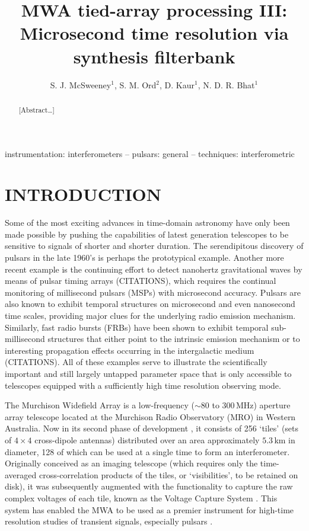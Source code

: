 \documentclass{pasa}%
\title[MWA tied-array processing III]{MWA tied-array processing III: Microsecond time resolution via synthesis filterbank}
\author[McSweeney et al.]{S. J. McSweeney$^1$, S. M. Ord$^2$, D. Kaur$^1$, N. D. R. Bhat$^1$
\affil{$^1$International Centre for Radio Astronomy Research (ICRAR), GPO Box U1987, Perth, WA 6845, Australia}%
\affil{$^2$CSIRO Astronomy and Space Science, PO Box 76, Epping, NSW 1710, Australia}
}
\begin{document}
\begin{frontmatter}
\maketitle

\begin{abstract}
[Abstract\dots]
\end{abstract}

\begin{keywords}
    instrumentation: interferometers -- pulsars: general -- techniques: interferometric
\end{keywords}
\end{frontmatter}


\section{INTRODUCTION}
\label{sec:intro}

Some of the most exciting advances in time-domain astronomy have only been made possible by pushing the capabilities of latest generation telescopes to be sensitive to signals of shorter and shorter duration.
The serendipitous discovery of pulsars in the late 1960's is perhaps the prototypical example.
Another more recent example is the continuing effort to detect nanohertz gravitational waves by means of pulsar timing arrays (CITATIONS), which requires the continual monitoring of millisecond pulsars (MSPs) with microsecond accuracy.
Pulsars are also known to exhibit temporal structures on microsecond and even nanosecond time scales, providing major clues for the underlying radio emission mechanism.
Similarly, fast radio bursts (FRBs) have been shown to exhibit temporal sub-millisecond structures that either point to the intrinsic emission mechanism or to interesting propagation effects occurring in the intergalactic medium (CITATIONS).
All of these examples serve to illustrate the scientifically important and still largely untapped parameter space that is only accessible to telescopes equipped with a sufficiently high time resolution observing mode.

The Murchison Widefield Array \citep[MWA;][]{Tingay2013} is a low-frequency ($\sim80$ to $300\,$MHz) aperture array telescope located at the Murchison Radio Observatory (MRO) in Western Australia.
Now in its second phase of development \citep[Phase II;][]{Wayth2018}, it consists of 256 `tiles' (sets of $4\times4$ cross-dipole antennas) distributed over an area approximately $5.3\,$km in diameter, 128 of which can be used at a single time to form an interferometer.
Originally conceived as an imaging telescope (which requires only the time-averaged cross-correlation products of the tiles, or `visibilities', to be retained on disk), it was subsequently augmented with the functionality to capture the raw complex voltages of each tile, known as the Voltage Capture System \citep[VCS;][]{Tremblay2015}.
This system has enabled the MWA to be used as a premier instrument for high-time resolution studies of transient signals, especially pulsars \citep[e.g.][]{Oronsaye2015,McSweeney2017,Bhat2018}.
\end{document}
